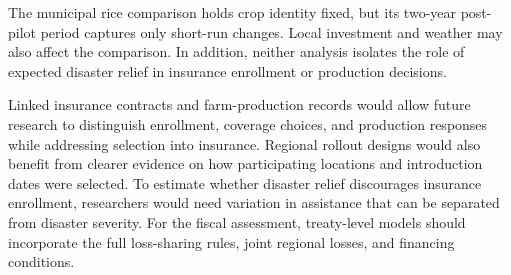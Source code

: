 The municipal rice comparison holds crop identity fixed, but its two-year post-pilot period captures only short-run changes. Local investment and weather may also affect the comparison. In addition, neither analysis isolates the role of expected disaster relief in insurance enrollment or production decisions.

Linked insurance contracts and farm-production records would allow future research to distinguish enrollment, coverage choices, and production responses while addressing selection into insurance. Regional rollout designs would also benefit from clearer evidence on how participating locations and introduction dates were selected. To estimate whether disaster relief discourages insurance enrollment, researchers would need variation in assistance that can be separated from disaster severity. For the fiscal assessment, treaty-level models should incorporate the full loss-sharing rules, joint regional losses, and financing conditions.
